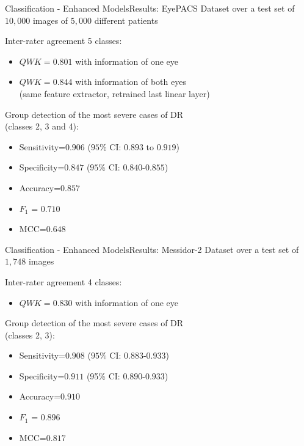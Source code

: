 \documentclass{beamer}
\begin{document}
\begin{frame}{Classification - Enhanced Models}{Results: EyePACS Dataset over a test set of $10,000$ images of $5,000$ different patients}	

Inter-rater agreement 5 classes:
\begin{itemize}
	\item $QWK=0.801$ with information of one eye
	\item $QWK=0.844$ with information of both eyes \\(same feature extractor, retrained last linear layer)
\end{itemize}
Group detection of the most severe cases of DR \\(classes 2, 3 and 4): 
\begin{itemize}
	\item Sensitivity=$0.906$ ($95$\% CI: $0.893$ to $0.919$)
	\item Specificity=$0.847$ ($95$\% CI: $0.840$-$0.855$)
	\item Accuracy=$0.857$
	\item $F_1$ = $0.710$
	\item MCC=$0.648$
\end{itemize}
\end{frame}

\begin{frame}{Classification - Enhanced Models}{Results: Messidor-2 Dataset over a test set of $1,748$ images}	

Inter-rater agreement 4 classes:
\begin{itemize}
	\item $QWK=0.830$ with information of one eye
\end{itemize}
Group detection of the most severe cases of DR \\(classes 2, 3): 
\begin{itemize}
	\item Sensitivity=$0.908$ ($95$\% CI: $0.883$-$0.933$)
	\item Specificity=$0.911$ (95\% CI: $0.890$-$0.933$)
	\item Accuracy=$0.910$
	\item $F_1$ = $0.896$
	\item MCC=$0.817$
\end{itemize}
\end{frame}
\end{document}
